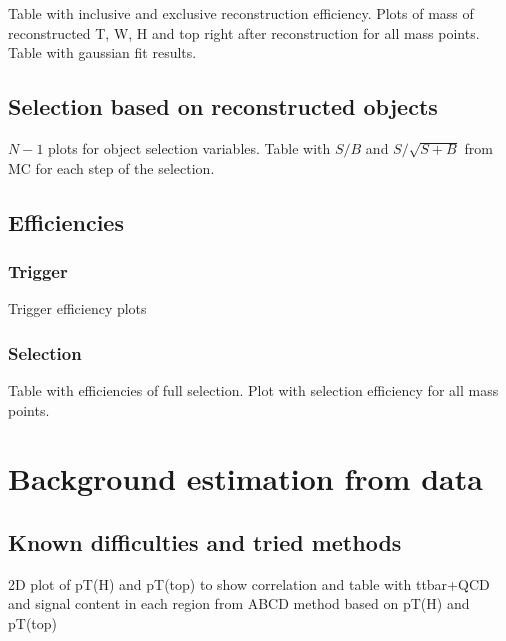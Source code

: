 \begin{TOINCLUDE}Table with inclusive and exclusive reconstruction efficiency. Plots of mass of reconstructed T, W, H and top right after reconstruction for all mass points. Table with gaussian fit results.\end{TOINCLUDE}

\subsection{Selection based on reconstructed objects}

\begin{TOINCLUDE}$N-1$ plots for object selection variables. Table with $S/B$ and $S/\sqrt{S+B}$ from MC for each step of the selection. \end{TOINCLUDE}

\subsection{Efficiencies}
\label{sec:eff}

\subsubsection{Trigger}
\label{sec:trigger}

\begin{TOINCLUDE}Trigger efficiency plots\end{TOINCLUDE}

\subsubsection{Selection}
\label{sec:seleff}

\begin{TOINCLUDE}Table with efficiencies of full selection. Plot with selection efficiency for all mass points.\end{TOINCLUDE}

\section{Background estimation from data}
\label{sec:bkg}

\subsection{Known difficulties and tried methods}
\label{sec:tried}

\begin{TOINCLUDE}2D plot of pT(H) and pT(top) to show correlation and table with ttbar+QCD and signal content in each region from ABCD method based on pT(H) and pT(top) \end{TOINCLUDE}

